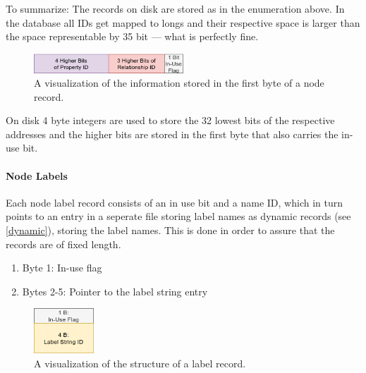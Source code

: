 \documentclass[a4paper,10pt]{article}
\begin{document}
            To summarize: The records on disk are stored as in the enumeration above. In the database all IDs get mapped to longs and their respective space is larger than the space representable by 35 bit --- what is perfectly fine.
        
            \begin{figure}[htp]\label{node_first_byte}
                \begin{center}
                    \includegraphics[keepaspectratio,height=0.4\textheight,width=0.5\textwidth]{img/03_record/node/node_first_byte.png}
                \end{center}
                \caption{A visualization of the information stored in the first byte of a node record.} %
            \end{figure}
        
            On disk 4 byte integers are used to store the 32 lowest bits of the respective addresses and the higher bits are stored in the first byte that also carries the in-use bit.
        
          \paragraph{Node Labels}
            Each node label record consists of an in use bit and a name ID, which in turn points to an entry in a seperate file storing label names as dynamic records (see \ref{dynamic}), storing the label names. This is done in order to assure that the records are of fixed length.
            \begin{enumerate}
                \item Byte 1: In-use flag
                \item Bytes 2-5: Pointer to the label string entry
            \end{enumerate}
            
            \begin{figure}[htp]\label{label_record}
                \begin{center}
                    \includegraphics[keepaspectratio,height=0.2\textheight,width=0.2\textwidth]{img/03_record/node/label_record.png}
                \end{center}
                \caption{A visualization of the structure of a label record.} %
            \end{figure}
            
\end{document}
